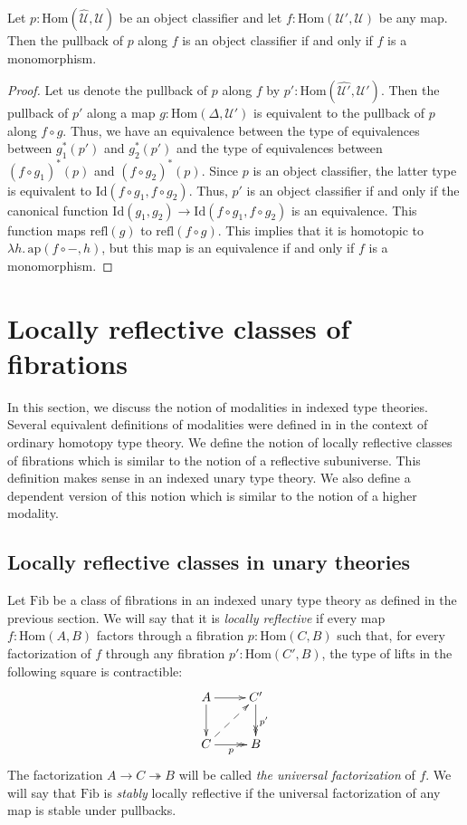 \documentclass[reqno]{amsart}
\theoremstyle{definition}
\theoremstyle{remark}
\newcommand{\fs}[1]{\mathrm{#1}}
\newcommand{\Hom}{\fs{Hom}}
\newcommand{\Id}{\fs{Id}}
\newcommand{\refl}{\fs{refl}}
\newcommand{\pmap}{\fs{ap}}
\newcommand{\Fib}{\fs{Fib}}
\numberwithin{figure}{section}
\begin{document}
\begin{prop}
Let $p : \Hom(\widehat{\mathcal{U}},\mathcal{U})$ be an object classifier and let $f : \Hom(\mathcal{U}',\mathcal{U})$ be any map.
Then the pullback of $p$ along $f$ is an object classifier if and only if $f$ is a monomorphism.
\end{prop}
\begin{proof}
Let us denote the pullback of $p$ along $f$ by $p' : \Hom(\widehat{\mathcal{U}'},\mathcal{U}')$.
Then the pullback of $p'$ along a map $g : \Hom(\Delta,\mathcal{U}')$ is equivalent to the pullback of $p$ along $f \circ g$.
Thus, we have an equivalence between the type of equivalences between $g_1^*(p')$ and $g_2^*(p')$ and the type of equivalences between $(f \circ g_1)^*(p)$ and $(f \circ g_2)^*(p)$.
Since $p$ is an object classifier, the latter type is equivalent to $\Id(f \circ g_1, f \circ g_2)$.
Thus, $p'$ is an object classifier if and only if the canonical function $\Id(g_1,g_2) \to \Id(f \circ g_1, f \circ g_2)$ is an equivalence.
This function maps $\refl(g)$ to $\refl(f \circ g)$.
This implies that it is homotopic to $\lambda h.\,\pmap(f \circ -, h)$, but this map is an equivalence if and only if $f$ is a monomorphism.
\end{proof}

\section{Locally reflective classes of fibrations}

In this section, we discuss the notion of modalities in indexed type theories.
Several equivalent definitions of modalities were defined in \cite{modality-hott} in the context of ordinary homotopy type theory.
We define the notion of locally reflective classes of fibrations which is similar to the notion of a reflective subuniverse.
This definition makes sense in an indexed unary type theory.
We also define a dependent version of this notion which is similar to the notion of a higher modality.

\subsection{Locally reflective classes in unary theories}

Let $\Fib$ be a class of fibrations in an indexed unary type theory as defined in the previous section.
We will say that it is \emph{locally reflective} if every map $f : \Hom(A,B)$ factors through a fibration $p : \Hom(C,B)$
such that, for every factorization of $f$ through any fibration $p' : \Hom(C',B)$, the type of lifts in the following square is contractible:
\[ \xymatrix{ A \ar[r] \ar[d]                   & C' \ar@{->>}[d]^{p'} \\
              C \ar@{->>}[r]_p \ar@{-->}[ur]    & B
            } \]
The factorization $A \to C \twoheadrightarrow B$ will be called \emph{the universal factorization} of $f$.
We will say that $\Fib$ is \emph{stably} locally reflective if the universal factorization of any map is stable under pullbacks.
\end{document}
